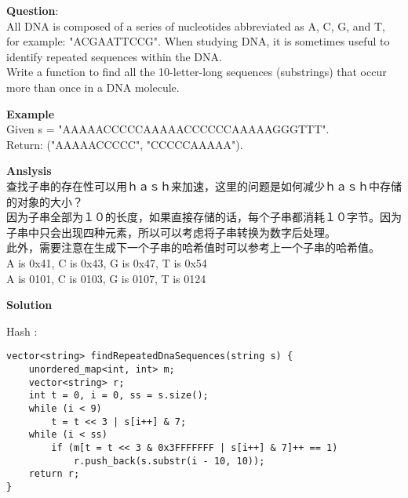     
\begin{description}
    \item{\textbf{Question}}:\\%
		All DNA is composed of a series of nucleotides abbreviated as A, C, G, and T, for example: "ACGAATTCCG". When studying DNA, it is sometimes useful to identify repeated sequences within the DNA.\\
		Write a function to find all the 10-letter-long sequences (substrings) that occur more than once in a DNA molecule.\\

    \item{\textbf{Example}}\\
		Given s = "AAAAACCCCCAAAAACCCCCCAAAAAGGGTTT".\\
		Return: ("AAAAACCCCC", "CCCCCAAAAA").\\

    \item{\textbf{Anslysis}}\\
		查找子串的存在性可以用ｈａｓｈ来加速，这里的问题是如何减少ｈａｓｈ中存储的对象的大小？\\
		因为子串全部为１０的长度，如果直接存储的话，每个子串都消耗１０字节。因为子串中只会出现四种元素，所以可以考虑将子串转换为数字后处理。\\
		此外，需要注意在生成下一个子串的哈希值时可以参考上一个子串的哈希值。\\
		A is 0x41, C is 0x43, G is 0x47, T is 0x54\\
		A is 0101, C is 0103, G is 0107, T is 0124\\

    \item{\textbf{Solution}}\\
	\item{Hash} : \\
		\begin{lstlisting}
vector<string> findRepeatedDnaSequences(string s) {
    unordered_map<int, int> m;
    vector<string> r;
    int t = 0, i = 0, ss = s.size();
    while (i < 9)
        t = t << 3 | s[i++] & 7;
    while (i < ss)
        if (m[t = t << 3 & 0x3FFFFFFF | s[i++] & 7]++ == 1)
            r.push_back(s.substr(i - 10, 10));
    return r;
}		\end{lstlisting}

\end{description}


